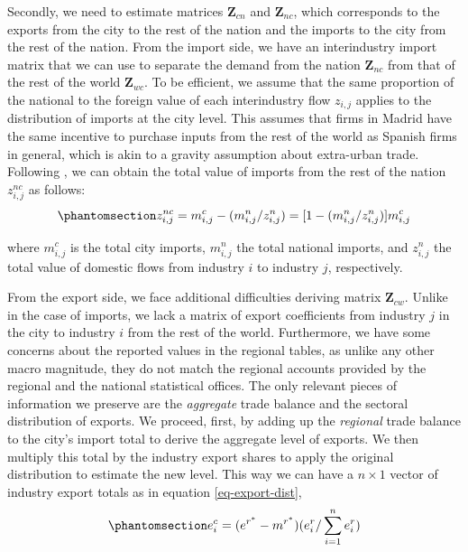 \documentclass[
  10pt,
  twocolumn]{aft}
\begin{document}
Secondly, we need to estimate matrices \(\textbf{Z}_{cn}\) and
\(\textbf{Z}_{nc}\), which corresponds to the exports from the city to
the rest of the nation and the imports to the city from the rest of the
nation. From the import side, we have an interindustry import matrix
that we can use to separate the demand from the nation
\(\textbf{Z}_{nc}\) from that of the rest of the world
\(\textbf{Z}_{wc}\). To be efficient, we assume that the same proportion
of the national to the foreign value of each interindustry flow
\(z_{i,j}\) applies to the distribution of imports at the city level.
This assumes that firms in Madrid have the same incentive to purchase
inputs from the rest of the world as Spanish firms in general, which is
akin to a gravity assumption about extra-urban trade. Following
\citet[p.~475]{miller_input-output_2022}, we can obtain the total value
of imports from the rest of the nation \(z^{nc}_{i,j}\) as follows:
\vspace{-1.5pt}
\begin{equation}\phantomsection\label{eq-import-dist}{ z^{nc}_{i,j} = m^c_{i,j} - (m^n_{i,j}/z^n_{i,j}) = [1 - (m^n_{i,j}/z^n_{i,j})]m^c_{i,j}}\end{equation}

where \(m^c_{i,j}\) is the total city imports, \(m^n_{i,j}\) the total
national imports, and \(z^n_{i,j}\) the total value of domestic flows
from industry \(i\) to industry \(j\), respectively.

From the export side, we face additional difficulties deriving matrix
\(\textbf{Z}_{cw}\). Unlike in the case of imports, we lack a matrix of
export coefficients from industry \(j\) in the city to industry \(i\)
from the rest of the world. Furthermore, we have some concerns about the
reported values in the regional tables, as unlike any other macro
magnitude, they do not match the regional accounts provided by the
regional and the national statistical offices. The only relevant pieces
of information we preserve are the \emph{aggregate} trade balance and
the sectoral distribution of exports. We proceed, first, by adding up
the \emph{regional} trade balance to the city's import total to derive
the aggregate level of exports. We then multiply this total by the
industry export shares to apply the original distribution to estimate
the new level. This way we can have a \(n \times 1\) vector of industry
export totals as in equation \ref{eq-export-dist}, \vspace{-3pt}
\begin{equation}\phantomsection\label{eq-export-dist}{ e^{c}_{i} = (e^{r^\ast} - m^{r^\ast})(e^r_{i}/\sum^n_{i=1}e^r_{i}) }\end{equation}
\end{document}
